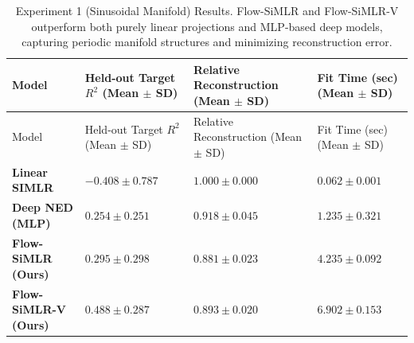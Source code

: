 \documentclass[
  letterpaper,
]{report}
\begin{document}
\begin{longtable}[]{@{}
  >{\raggedright\arraybackslash}p{}
  >{\centering\arraybackslash}p{}
  >{\centering\arraybackslash}p{}
  >{\centering\arraybackslash}p{}@{}}
\caption{Experiment 1 (Sinusoidal Manifold) Results. Flow-SiMLR and
Flow-SiMLR-V outperform both purely linear projections and MLP-based
deep models, capturing periodic manifold structures and minimizing
reconstruction error.}\label{tbl-exp1-results}\tabularnewline
\toprule\noalign{}
\begin{minipage}[b]{\linewidth}\raggedright
Model
\end{minipage} & \begin{minipage}[b]{\linewidth}\centering
Held-out Target \(R^2\) (Mean \(\pm\) SD)
\end{minipage} & \begin{minipage}[b]{\linewidth}\centering
Relative Reconstruction (Mean \(\pm\) SD)
\end{minipage} & \begin{minipage}[b]{\linewidth}\centering
Fit Time (sec) (Mean \(\pm\) SD)
\end{minipage} \\
\midrule\noalign{}
\endfirsthead
\toprule\noalign{}
\begin{minipage}[b]{\linewidth}\raggedright
Model
\end{minipage} & \begin{minipage}[b]{\linewidth}\centering
Held-out Target \(R^2\) (Mean \(\pm\) SD)
\end{minipage} & \begin{minipage}[b]{\linewidth}\centering
Relative Reconstruction (Mean \(\pm\) SD)
\end{minipage} & \begin{minipage}[b]{\linewidth}\centering
Fit Time (sec) (Mean \(\pm\) SD)
\end{minipage} \\
\midrule\noalign{}
\endhead
\bottomrule\noalign{}
\endlastfoot
\textbf{Linear SIMLR} & \(-0.408 \pm 0.787\) & \(1.000 \pm 0.000\) &
\(0.062 \pm 0.001\) \\
\textbf{Deep NED (MLP)} & \(0.254 \pm 0.251\) & \(0.918 \pm 0.045\) &
\(1.235 \pm 0.321\) \\
\textbf{Flow-SiMLR (Ours)} & \(0.295 \pm 0.298\) &
\(\mathbf{0.881 \pm 0.023}\) & \(4.235 \pm 0.092\) \\
\textbf{Flow-SiMLR-V (Ours)} & \(\mathbf{0.488 \pm 0.287}\) &
\(0.893 \pm 0.020\) & \(6.902 \pm 0.153\) \\
\end{longtable}
\end{document}
